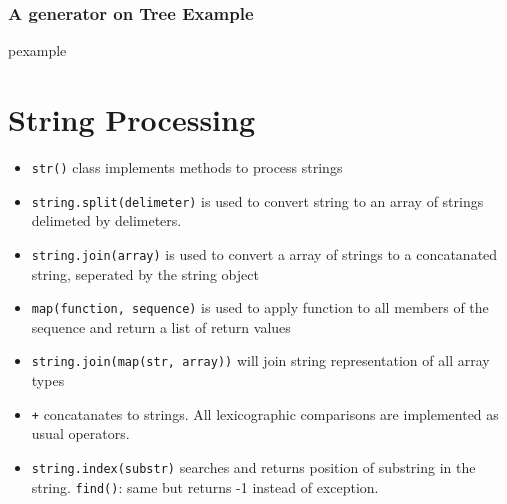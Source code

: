 \documentclass[trans,compress,xcolor=table]{beamer}
\begin{document}
\begin{frame}
\frametitle{A  generator on Tree Example}
\begin{beamercolorbox}{pexample}
\codebstgen
\end{beamercolorbox}
\end{frame}


\section{String Processing}
\begin{frame}
\begin{itemize}
\frametitle{String Processing}
\item \lstinline!str()! class implements methods to process strings
\item \lstinline!string.split(delimeter)! is used to convert string to 
	an array of strings delimeted by delimeters.
\item \lstinline!string.join(array)! is used to convert a array of
strings to a concatanated string, seperated by the string object
\item \lstinline!map(function, sequence)! is used to apply function to
   all members of the sequence and return a list of return values
\item \lstinline!string.join(map(str, array))! will join string
	representation of all array types
\item \lstinline!+! concatanates to strings. All lexicographic
	comparisons are implemented as usual operators.
\item \lstinline!string.index(substr)! searches and returns position
	of substring in the string. \lstinline!find()!: same but
	returns -1 instead of exception.
\end{itemize}
\end{frame}
\end{document}
